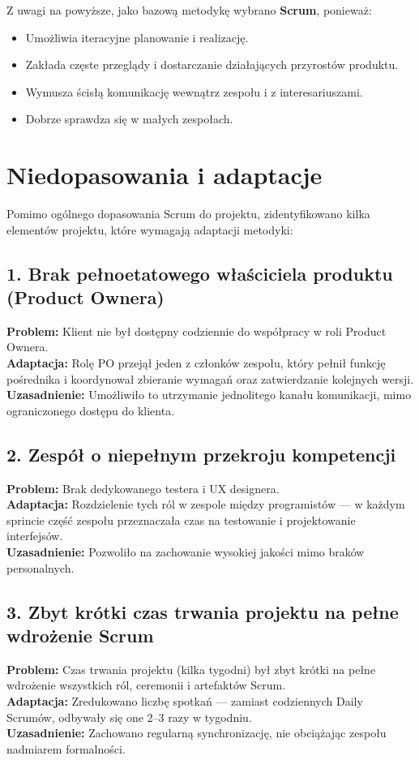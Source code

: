 \documentclass[12pt,a4paper,colorlinks=true,linkcolor=NavyBlue,citecolor=red,urlcolor=NavyBlue]{book}
\begin{document}
Z uwagi na powyższe, jako bazową metodykę wybrano \textbf{Scrum}, ponieważ:
\begin{itemize}
  \item Umożliwia iteracyjne planowanie i realizację.
  \item Zakłada częste przeglądy i dostarczanie działających przyrostów produktu.
  \item Wymusza ścisłą komunikację wewnątrz zespołu i z interesariuszami.
  \item Dobrze sprawdza się w małych zespołach.
\end{itemize}

\section{Niedopasowania i adaptacje}

Pomimo ogólnego dopasowania Scrum do projektu, zidentyfikowano kilka elementów projektu, które wymagają adaptacji metodyki:

\subsection*{1. Brak pełnoetatowego właściciela produktu (Product Ownera)}
\textbf{Problem:} Klient nie był dostępny codziennie do współpracy w roli Product Ownera.\\
\textbf{Adaptacja:} Rolę PO przejął jeden z członków zespołu, który pełnił funkcję pośrednika i koordynował zbieranie wymagań oraz zatwierdzanie kolejnych wersji.\\
\textbf{Uzasadnienie:} Umożliwiło to utrzymanie jednolitego kanału komunikacji, mimo ograniczonego dostępu do klienta.

\subsection*{2. Zespół o niepełnym przekroju kompetencji}
\textbf{Problem:} Brak dedykowanego testera i UX designera.\\
\textbf{Adaptacja:} Rozdzielenie tych ról w zespole między programistów — w każdym sprincie część zespołu przeznaczała czas na testowanie i projektowanie interfejsów.\\
\textbf{Uzasadnienie:} Pozwoliło na zachowanie wysokiej jakości mimo braków personalnych.

\subsection*{3. Zbyt krótki czas trwania projektu na pełne wdrożenie Scrum}
\textbf{Problem:} Czas trwania projektu (kilka tygodni) był zbyt krótki na pełne wdrożenie wszystkich ról, ceremonii i artefaktów Scrum.\\
\textbf{Adaptacja:} Zredukowano liczbę spotkań — zamiast codziennych Daily Scrumów, odbywały się one 2–3 razy w tygodniu.\\
\textbf{Uzasadnienie:} Zachowano regularną synchronizację, nie obciążając zespołu nadmiarem formalności.
\end{document}
